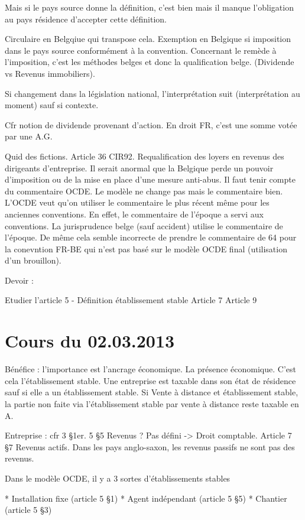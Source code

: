 \documentclass{book}
\begin{document}
Mais si le pays source donne la définition, c’est bien mais il manque l’obligation au pays résidence d’accepter cette définition.

Circulaire en Belgqiue qui transpose cela. Exemption en Belgique si imposition dans le pays source conformément à la convention. Concernant le remède à l’imposition, c’est les méthodes belges et donc la qualification belge. (Dividende vs Revenus immobiliers).

Si changement dans la législation national, l’interprétation suit (interprétation au moment) sauf si contexte.

Cfr notion de dividende provenant d'action. En droit FR, c'est une somme votée par une A.G.

Quid des fictions. Article 36 CIR92. Requalification des loyers en revenus des dirigeants d'entreprise. Il serait anormal que la Belgique perde un pouvoir d'imposition ou de la mise en place d'une mesure anti-abus. Il faut tenir compte du commentaire OCDE. Le modèle ne change pas mais le commentaire bien. L'OCDE veut qu'on utiliser le commentaire le plus récent même pour les anciennes conventions. En effet, le commentaire de l'époque a servi aux conventions. La jurisprudence belge (sauf accident) utilise le commentaire de l'époque. De même cela semble incorrecte de prendre le commentaire de 64 pour la conevntion FR-BE qui n'est pas basé sur le modèle OCDE final (utilisation d'un brouillon).

Devoir :

Etudier l'article 5 - Définition établissement stable
Article 7
Article 9
 
\chapter{Cours du 02.03.2013}

Bénéfice : l'importance est l'ancrage économique. La présence économique. C'est cela l'établissement stable. Une entreprise est taxable dans son état de résidence sauf si elle a un établissement stable. Si Vente à distance et établissement stable, la partie non faite via l'établissement stable par vente à distance reste taxable en A.

Entreprise : cfr 3 §1er. 5 §5 Revenus ? Pas défini -> Droit comptable. Article 7 §7 Revenus actifs.	Dans les pays anglo-saxon, les revenus passifs ne sont pas des revenus.

Dans le modèle OCDE, il y a 3 sortes d'établissements stables

* Installation fixe (article 5 §1)
* Agent indépendant (article 5 §5)
* Chantier (article 5 §3)
 
\end{document}
